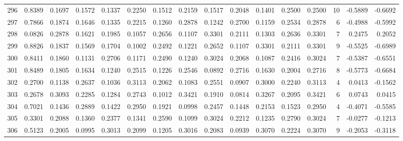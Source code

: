 \begin{tabular}{lrrrrrrrrrrrrrrr}
296 &      0.8389 &  0.1697 &  0.1572 &  0.1337 &  0.2250 &  0.1512 &  0.2159 &  0.1517 &  0.2048 &  0.1401 &   0.2500 &     0.2500 &     10 &                   -0.5889 &                    -0.6692 \\
297 &      0.7866 &  0.1874 &  0.1646 &  0.1335 &  0.2215 &  0.1260 &  0.2878 &  0.1242 &  0.2700 &  0.1159 &   0.2534 &     0.2878 &      6 &                   -0.4988 &                    -0.5992 \\
298 &      0.0826 &  0.2878 &  0.1621 &  0.1985 &  0.1057 &  0.2656 &  0.1107 &  0.3301 &  0.2111 &  0.1303 &   0.2636 &     0.3301 &      7 &                    0.2475 &                     0.2052 \\
299 &      0.8826 &  0.1837 &  0.1569 &  0.1704 &  0.1002 &  0.2492 &  0.1221 &  0.2652 &  0.1107 &  0.3301 &   0.2111 &     0.3301 &      9 &                   -0.5525 &                    -0.6989 \\
300 &      0.8411 &  0.1860 &  0.1131 &  0.2706 &  0.1171 &  0.2490 &  0.1240 &  0.3024 &  0.2068 &  0.1087 &   0.2416 &     0.3024 &      7 &                   -0.5387 &                    -0.6551 \\
301 &      0.8489 &  0.1805 &  0.1634 &  0.1240 &  0.2515 &  0.1226 &  0.2546 &  0.0892 &  0.2716 &  0.1630 &   0.2004 &     0.2716 &      8 &                   -0.5773 &                    -0.6684 \\
302 &      0.2700 &  0.1138 &  0.2637 &  0.1036 &  0.3113 &  0.2062 &  0.1083 &  0.2551 &  0.0907 &  0.3000 &   0.2240 &     0.3113 &      4 &                    0.0413 &                    -0.1562 \\
303 &      0.2678 &  0.3093 &  0.2285 &  0.1284 &  0.2743 &  0.1012 &  0.3421 &  0.1910 &  0.0814 &  0.3267 &   0.2095 &     0.3421 &      6 &                    0.0743 &                     0.0415 \\
304 &      0.7021 &  0.1436 &  0.2889 &  0.1422 &  0.2950 &  0.1921 &  0.0998 &  0.2457 &  0.1448 &  0.2153 &   0.1523 &     0.2950 &      4 &                   -0.4071 &                    -0.5585 \\
305 &      0.3301 &  0.2088 &  0.1360 &  0.2377 &  0.1341 &  0.2590 &  0.1099 &  0.3024 &  0.2212 &  0.1235 &   0.2790 &     0.3024 &      7 &                   -0.0277 &                    -0.1213 \\
306 &      0.5123 &  0.2005 &  0.0995 &  0.3013 &  0.2099 &  0.1205 &  0.3016 &  0.2083 &  0.0939 &  0.3070 &   0.2224 &     0.3070 &      9 &                   -0.2053 &                    -0.3118 \\

\end{tabular}
